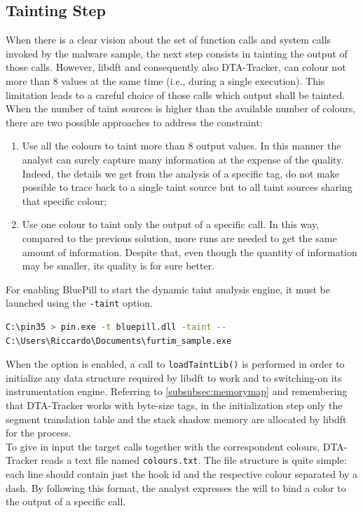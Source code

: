 \documentclass[LaM,binding=0.6cm]{sapthesis}
\begin{document}
\subsection{Tainting Step}
\label{subsec:taintingstep}
When there is a clear vision about the set of function calls and system calls invoked by the malware sample, the next step consists in tainting the output of those calls. However, libdft and consequently also DTA-Tracker, can colour not more than $8$ values at the same time (i.e., during a single execution). This limitation leads to a careful choice of those calls which output shall be tainted. When the number of taint sources is higher than the available number of colours, there are two possible approaches to address the constraint:
\begin{enumerate}
\item Use all the colours to taint more than $8$ output values. In this manner the analyst can surely capture many information at the expense of the quality. Indeed, the details we get from the analysis of a specific tag, do not make possible to trace back to a single taint source but to all taint sources sharing that specific colour;
\item Use one colour to taint only the output of a specific call. In this way, compared to the previous solution, more runs are needed to get the same amount of information. Despite that, even though the quantity of information may be smaller, its quality is for sure better.
\end{enumerate}
For enabling BluePill to start the dynamic taint analysis engine, it must be launched using the \texttt{-taint} option.
\begin{lstlisting}[language=bash]
C:\pin35 > pin.exe -t bluepill.dll -taint -- 
C:\Users\Riccardo\Documents\furtim_sample.exe
\end{lstlisting}
When the option is enabled, a call to \texttt{loadTaintLib()} is performed in order to initialize any data structure required by libdft to work and to switching-on its instrumentation engine. Referring to \autoref{subsubsec:memorymap} and remembering that DTA-Tracker works with byte-size tags, in the initialization step only the segment translation table and the stack shadow memory are allocated by libdft for the process.\\

To give in input the target calls together with the correspondent colours, DTA-Tracker reads a text file named \texttt{colours.txt}. The file structure is quite simple: each line should contain just the hook id and the respective colour separated by a dash. By following this format, the analyst expresses the will to bind a color to the output of a specific call.\\
\end{document}
